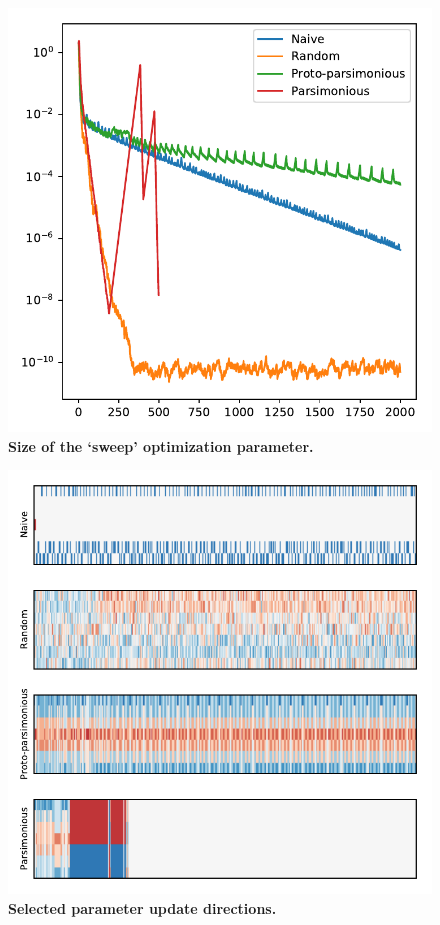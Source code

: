 \documentclass{article}
\begin{document}
\begin{figure}[!ht]
\centering
\includegraphics{seed25/figure2-scale}
\caption{\textbf{Size of the `sweep' optimization parameter.}}
\label{figure:sweep}
\end{figure}

\begin{figure}[!ht]
\centering
\includegraphics{seed25/figure3-directions}
\caption{\textbf{Selected parameter update directions.}}
\label{figure:directions}
\end{figure}
\end{document}
